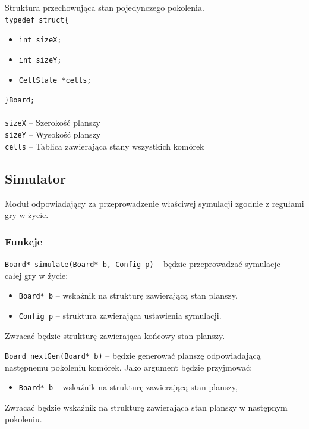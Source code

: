 \documentclass{article}
\begin{document}
\vspace{5mm}

\noindent{}Struktura przechowująca stan pojedynczego pokolenia. \\
\texttt{typedef struct\{}
\begin{itemize}[label={}, noitemsep, topsep=0pt]
	\item \texttt{int sizeX;}
	\item \texttt{int sizeY;}
	\item \texttt{CellState *cells;}
\end{itemize}
\texttt{\}Board;\\} \\
\texttt{sizeX} -- Szerokość planszy \\
\texttt{sizeY} -- Wysokość planszy \\
\texttt{cells} -- Tablica zawierająca stany wszystkich komórek


\subsection{Simulator}
Moduł odpowiadający za przeprowadzenie właściwej symulacji zgodnie z regułami gry w życie.

\subsubsection{Funkcje}
\texttt{Board* simulate(Board* b, Config p)} -- będzie przeprowadzać symulacje\\ całej gry w życie:
\begin{itemize}[label={}]
	\item \texttt{Board* b} -- wskaźnik na strukturę zawierającą stan planszy,
	\item \texttt{Config p} -- struktura zawierająca ustawienia symulacji.
\end{itemize}
Zwracać będzie strukturę zawierająca końcowy stan planszy.

\vspace{5mm}

\noindent{}\texttt{Board nextGen(Board* b)} -- będzie generować planszę odpowiadającą następnemu pokoleniu komórek. Jako argument będzie przyjmować:
\begin{itemize}[label={}]
	\item \texttt{Board* b} -- wskaźnik na strukturę zawierającą stan planszy,
\end{itemize}
Zwracać będzie wskaźnik na strukturę zawierająca stan planszy w następnym pokoleniu.
\end{document}
